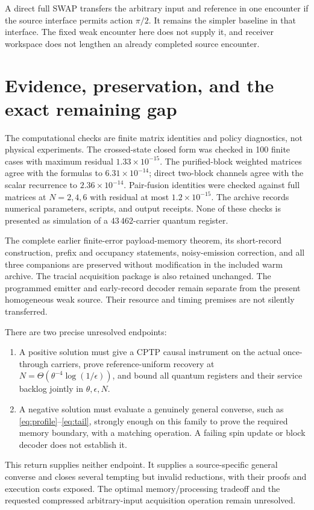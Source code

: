 \documentclass[11pt]{article}
\begin{document}
A direct full SWAP transfers the arbitrary input and reference in one
encounter if the source interface permits action $\pi/2$. It remains the
simpler baseline in that interface. The fixed weak encounter here does not
supply it, and receiver workspace does not lengthen an already completed
source encounter.

\section{Evidence, preservation, and the exact remaining gap}

The computational checks are finite matrix identities and policy diagnostics,
not physical experiments. The crossed-state closed form was checked in 100
finite cases with maximum residual $1.33\times10^{-15}$. The purified-block
weighted matrices agree with the formulas to $6.31\times10^{-14}$; direct
two-block channels agree with the scalar recurrence to
$2.36\times10^{-14}$. Pair-fusion identities were checked against full
matrices at $N=2,4,6$ with residual at most $1.2\times10^{-15}$.
The archive records numerical parameters, scripts, and output receipts.
None of these checks is presented as simulation of a $43\,462$-carrier
quantum register.

The complete earlier finite-error payload-memory theorem, its short-record
construction, prefix and occupancy statements, noisy-emission correction,
and all three companions are preserved without modification in the included
warm archive. The tracial acquisition package is also retained unchanged.
The programmed emitter and early-record decoder remain separate from the
present homogeneous weak source. Their resource and timing premises are not
silently transferred.

There are two precise unresolved endpoints:
\begin{enumerate}
\item A positive solution must give a CPTP causal instrument on the actual
once-through carriers, prove reference-uniform recovery at
$N=\Theta(\theta^{-4}\log(1/\epsilon))$, and bound all quantum registers
and their service backlog jointly in $\theta,\epsilon,N$.
\item A negative solution must evaluate a genuinely general converse, such
as \eqref{eq:profile}--\eqref{eq:tail}, strongly enough on this family to
prove the required memory boundary, with a matching operation. A failing
spin update or block decoder does not establish it.
\end{enumerate}
This return supplies neither endpoint. It supplies a source-specific general
converse and closes several tempting but invalid reductions, with their
proofs and execution costs exposed. The optimal memory/processing tradeoff
and the requested compressed arbitrary-input acquisition operation remain
unresolved.
\end{document}
